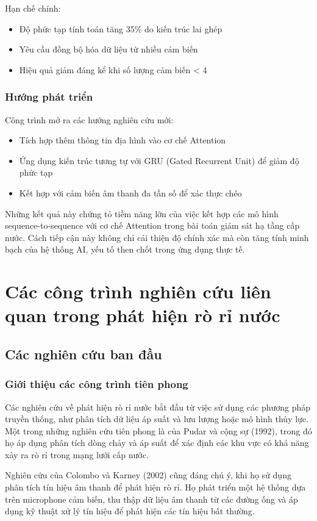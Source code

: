 Hạn chế chính:
\begin{itemize}
\item Độ phức tạp tính toán tăng 35\% do kiến trúc lai ghép
\item Yêu cầu đồng bộ hóa dữ liệu từ nhiều cảm biến
\item Hiệu quả giảm đáng kể khi số lượng cảm biến < 4
\end{itemize}

\subsubsection*{Hướng phát triển}
Công trình mở ra các hướng nghiên cứu mới:
\begin{itemize}
\item Tích hợp thêm thông tin địa hình vào cơ chế Attention
\item Ứng dụng kiến trúc tương tự với GRU (Gated Recurrent Unit) để giảm độ phức tạp
\item Kết hợp với cảm biến âm thanh đa tần số để xác thực chéo
\end{itemize}

Những kết quả này chứng tỏ tiềm năng lớn của việc kết hợp các mô hình sequence-to-sequence với cơ chế Attention trong bài toán giám sát hạ tầng cấp nước. Cách tiếp cận này không chỉ cải thiện độ chính xác mà còn tăng tính minh bạch của hệ thống AI, yếu tố then chốt trong ứng dụng thực tế.


\section{Các công trình nghiên cứu liên quan trong phát hiện rò rỉ nước}

\subsection{Các nghiên cứu ban đầu}
\subsubsection{Giới thiệu các công trình tiên phong}
Các nghiên cứu về phát hiện rò rỉ nước bắt đầu từ việc sử dụng các phương pháp truyền thống, như phân tích dữ liệu áp suất và lưu lượng hoặc mô hình thủy lực. Một trong những nghiên cứu tiên phong là của Pudar và cộng sự (1992), trong đó họ áp dụng phân tích dòng chảy và áp suất để xác định các khu vực có khả năng xảy ra rò rỉ trong mạng lưới cấp nước. 

Nghiên cứu của Colombo và Karney (2002) cũng đáng chú ý, khi họ sử dụng phân tích tín hiệu âm thanh để phát hiện rò rỉ. Họ phát triển một hệ thống dựa trên microphone cảm biến, thu thập dữ liệu âm thanh từ các đường ống và áp dụng kỹ thuật xử lý tín hiệu để phát hiện các tín hiệu bất thường.

